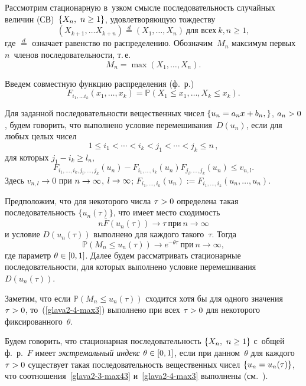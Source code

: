 \begin{multicols}{2}
Рассмотрим  стационарную в~узком смыс\-ле по\-сле\-до\-ва\-тель\-ность   случайных величин 
(СВ)\  $\{ X_n , \ n\hm\ge 1\}$, удовлетворяющую тождеству
$$
(X_{k+1},\dots X_{k+n})\overset{d}{=}  (X_1,\dots,X_n) \ \mbox{для всех} \  
k,n\ge 1,
$$
где $\overset{d}{=}$ означает  равенство по распределению.
Обозначим~$M_n$ максимум  первых~$n$~членов последовательности, т.\,е.
\begin{equation*}
   M_n=\max \left(X_1, \dots , X_n\right).
\end{equation*}

Введем совместную функцию распределения (ф.~р.)
$$
F_{i_1,\dots i_k} \left(x_1,\dots , x_k\right) = \mathbb{P} \left(X_1 \le x_1, \dots , X_k\le x_k\right).
$$

Для заданной последовательности вещественных чисел $\{ u_n \hm= a_n x\hm+ b_n, \}$, 
$a_n \hm> 0$, будем говорить, что выполнено   условие перемешивания~$D(u_n)$, если 
для любых целых чисел
$$
1\le i_1 <\cdots <i_k<j_1<\cdots <j_k\le n\,,
$$
для которых $j_1-i_k\ge l_n,$
\begin{equation*}
    F_{i_1,\dots ,i_k,j_i,\dots ,j_k} (u_n) -  F_{i_1,\dots ,i_k} (u_n)  
F_{j_i,\dots ,j_k} (u_n) \le v_{n,l}.
\end{equation*}
Здесь $v_{n, l}\to 0$ при $n\hm\to \infty$, $l\hm\to \infty$; $F_{i_1,\dots ,i_k} 
(u_n){:=}F_{i_1,\dots ,i_k} (u_n,\dots ,u_n)$.


Предположим, что
для некоторого числа $\tau\hm>0$ определена такая последовательность $\{ u_n (\tau) \}$, 
что имеет место схо\-ди\-мость
\begin{equation}
\label{glava2-3-max43}
n\overline F(u_n(\tau))\to \tau \ \mbox{при} \ n\to \infty
\end{equation}
и условие $D(u_n(\tau))$ выполнено для каждого такого~$\tau$. Тогда~\cite{Leadbetter}
\begin{equation}
\label{glava2-4-max3}
\mathbb{P} \left(M_n \le u_n (\tau)\right) \to e^{-\theta \tau} \ \mbox{при} \ n\to \infty,
\end{equation}
где параметр  $\theta \hm\in [0, 1]$. Далее будем рассматривать стационарные 
последовательности, для которых выполнено условие перемешивания~$D(u_n(\tau))$.


Заметим, что если $\mathbb{P} (M_n\le u_n(\tau))$ сходится хотя бы для одного значения 
$\tau \hm> 0$, то~(\ref{glava2-4-max3}) выполнено при всех $\tau \hm> 0$ для 
некоторого фиксированного~$\theta$.


Будем говорить, что  стационарная последовательность $\{ X_n , \ n\hm\ge 1\}$  
с~общей ф.~р.~$F$ имеет \textit{экстремальный индекс} $\theta \hm\in
[0, 1]$, если при данном~$\theta$ для каждого $\tau \hm> 0$ существует такая 
последовательность вещественных чисел $\{ u_n\hm=u_n(\tau)\}$, что соотношения~\eqref{glava2-3-max43} 
и~\eqref{glava2-4-max3} выполнены (см.~\cite{embrehts}).



\end{multicols}
